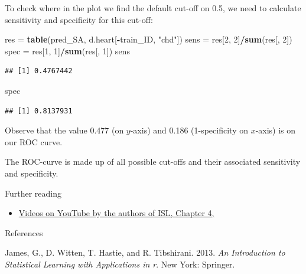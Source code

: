 \documentclass[
  10pt,
  ignorenonframetext,
]{beamer}
\newenvironment{Shaded}{\begin{snugshade}}{\end{snugshade}}
\newcommand{\DecValTok}[1]{\textcolor[rgb]{0.00,0.00,0.81}{#1}}
\newcommand{\FunctionTok}[1]{\textcolor[rgb]{0.13,0.29,0.53}{\textbf{#1}}}
\newcommand{\NormalTok}[1]{#1}
\newcommand{\OtherTok}[1]{\textcolor[rgb]{0.56,0.35,0.01}{#1}}
\newcommand{\SpecialCharTok}[1]{\textcolor[rgb]{0.81,0.36,0.00}{\textbf{#1}}}
\newcommand{\StringTok}[1]{\textcolor[rgb]{0.31,0.60,0.02}{#1}}
\providecommand{\tightlist}{%
  \setlength{\itemsep}{0pt}\setlength{\parskip}{0pt}}
\newlength{\cslhangindent}
\newlength{\cslentryspacingunit} %
\newenvironment{CSLReferences}[2] %
 {%
  \setlength{\parindent}{0pt}
  \ifodd #1
  \let\oldpar\par
  \def\par{\hangindent=\cslhangindent\oldpar}
  \fi
  \setlength{\parskip}{#2\cslentryspacingunit}
 }%
 {}
\begin{document}
\begin{frame}[fragile]
To check where in the plot we find the default cut-off on 0.5, we need
to calculate sensitivity and specificity for this cut-off:

\scriptsize

\begin{Shaded}
\begin{Highlighting}[]
\NormalTok{res }\OtherTok{=} \FunctionTok{table}\NormalTok{(pred\_SA, d.heart[}\SpecialCharTok{{-}}\NormalTok{train\_ID, }\StringTok{"chd"}\NormalTok{])}
\NormalTok{sens }\OtherTok{=}\NormalTok{ res[}\DecValTok{2}\NormalTok{, }\DecValTok{2}\NormalTok{]}\SpecialCharTok{/}\FunctionTok{sum}\NormalTok{(res[, }\DecValTok{2}\NormalTok{])}
\NormalTok{spec }\OtherTok{=}\NormalTok{ res[}\DecValTok{1}\NormalTok{, }\DecValTok{1}\NormalTok{]}\SpecialCharTok{/}\FunctionTok{sum}\NormalTok{(res[, }\DecValTok{1}\NormalTok{])}
\NormalTok{sens}
\end{Highlighting}
\end{Shaded}

\begin{verbatim}
## [1] 0.4767442
\end{verbatim}

\begin{Shaded}
\begin{Highlighting}[]
\NormalTok{spec}
\end{Highlighting}
\end{Shaded}

\begin{verbatim}
## [1] 0.8137931
\end{verbatim}

\normalsize

Observe that the value 0.477 (on \(y\)-axis) and 0.186 (1-specificity on
\(x\)-axis) is on our ROC curve.

The ROC-curve is made up of all possible cut-offs and their associated
sensitivity and specificity.
\end{frame}

\begin{frame}{Further reading}
\protect\hypertarget{further-reading}{}
\begin{itemize}
\tightlist
\item
  \href{https://www.youtube.com/playlist?list=PL5-da3qGB5IC4vaDba5ClatUmFppXLAhE}{Videos
  on YouTube by the authors of ISL, Chapter 4,}
\end{itemize}
\end{frame}

\begin{frame}{References}
\protect\hypertarget{references}{}
\hypertarget{refs}{}
\begin{CSLReferences}{1}{0}
\leavevmode{}%
James, G., D. Witten, T. Hastie, and R. Tibshirani. 2013. \emph{An
Introduction to Statistical Learning with Applications in r}. New York:
Springer.

\end{CSLReferences}
\end{frame}
\end{document}
